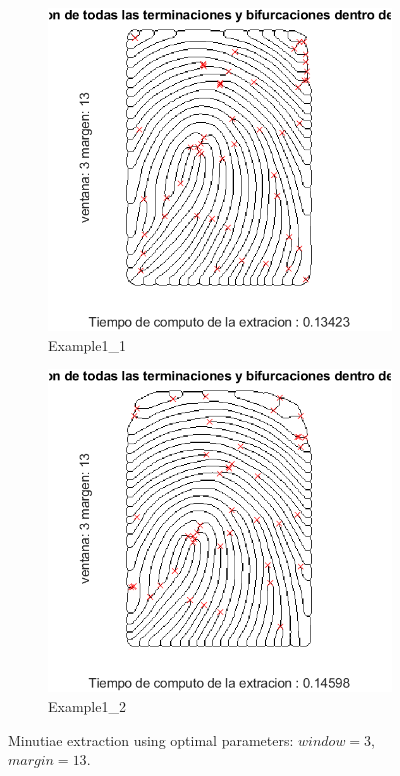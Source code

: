 \documentclass[a4paper]{article}
\begin{document}
\begin{figure}[H]
  \centering
       \begin{subfigure}[t]{0.45\textwidth}
         \centering
         \includegraphics[scale=0.7]{Figures/Minutiae1-optim}
         \caption{Example1\_1}
     \end{subfigure}%
     \quad
     \begin{subfigure}[t]{0.45\textwidth}
         \centering
         \includegraphics[scale=0.7]{Figures/Minutiae2-optim}
         \caption{Example1\_2}
     \end{subfigure}
    \caption{Minutiae extraction using optimal parameters: \(window = 3\), \(margin=13\).}
    \label{fig:ex5bfinal}
\end{figure}
\end{document}
